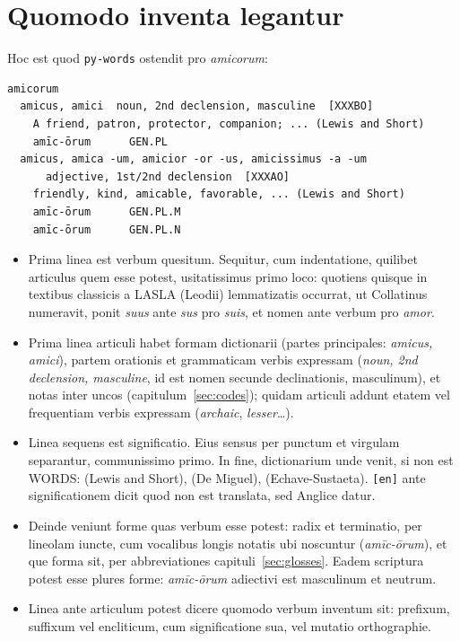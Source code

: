 \documentclass[12pt,
              article,
              oneside
              ]{memoir}
\begin{document}
\section{Quomodo inventa legantur}
\label{sec:results}

%
Hoc est quod \texttt{py-words} ostendit pro \textit{amicorum}:

\begin{verbatim}
amicorum
  amicus, amici  noun, 2nd declension, masculine  [XXXBO]
    A friend, patron, protector, companion; ... (Lewis and Short)
    amīc-ōrum      GEN.PL
  amicus, amica -um, amicior -or -us, amicissimus -a -um
      adjective, 1st/2nd declension  [XXXAO]
    friendly, kind, amicable, favorable, ... (Lewis and Short)
    amīc-ōrum      GEN.PL.M
    amīc-ōrum      GEN.PL.N
\end{verbatim}

%
\begin{itemize}
\item Prima linea est verbum quesitum. Sequitur, cum indentatione,
  quilibet articulus quem esse potest, usitatissimus primo loco: quotiens
  quisque in textibus classicis a LASLA (Leodii) lemmatizatis occurrat,
  ut Collatinus numeravit, ponit \textit{suus} ante \textit{sus} pro
  \textit{suis}, et nomen ante verbum pro \textit{amor}.
\item Prima linea articuli habet formam dictionarii (partes principales:
  \textit{amicus, amici}), partem orationis et grammaticam verbis
  expressam (\textit{noun, 2nd declension, masculine}, id est nomen
  secunde declinationis, masculinum), et notas inter uncos
  (capitulum~\ref{sec:codes}); quidam articuli addunt etatem vel
  frequentiam verbis expressam (\textit{archaic}, \textit{lesser}\ldots).
\item Linea sequens est significatio. Eius sensus per punctum et virgulam
  separantur, communissimo primo. In fine, dictionarium unde venit, si non
  est WORDS: (Lewis and Short), (De Miguel), (Echave-Sustaeta).
  \texttt{[en]} ante significationem dicit quod non est translata, sed
  Anglice datur.
\item Deinde veniunt forme quas verbum esse potest: radix et terminatio,
  per lineolam iuncte, cum vocalibus longis notatis ubi noscuntur
  (\textit{amīc-ōrum}), et que forma sit, per abbreviationes capituli~\ref{sec:glosses}.
  Eadem scriptura potest esse plures forme: \textit{amīc-ōrum} adiectivi
  est masculinum et neutrum.
\item Linea ante articulum potest dicere quomodo verbum inventum sit:
  prefixum, suffixum vel encliticum, cum significatione sua, vel
  mutatio orthographie.
\end{itemize}
\end{document}
